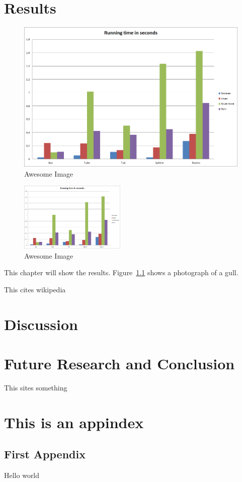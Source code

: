 \documentclass[11pt,twoside,a4paper]{report}
\begin{document}
\chapter{Results}


\begin{figure}[h]
    \centering
    \includegraphics[width=0.45\linewidth]{images/running_time_seconds}
    \caption{Awesome Image}
    \label{fig:awesome_image1}
\end{figure}
\begin{figure}[h]
    \centering
    \includegraphics[width=0.45\textwidth]{images/running_time_seconds}
    \caption{Awesome Image}
    \label{fig:awesome_image2}
\end{figure}

This chapter will show the results. Figure~\ref{fig:awesome_image1} shows a photograph of a gull.

This \cite{wiki:123} cites wikipedia
\chapter{Discussion}

\chapter{Future Research and Conclusion}
This \cite{amanatides1987fast} sites something




\listoffigures
\listoftables
\appendix
\chapter{This is an appindex}
\section{First Appendix}
Hello world
\end{document}
